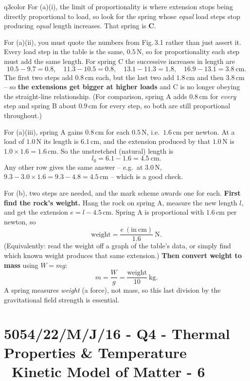 \documentclass[11pt,a4paper]{article}
\newcommand{\examq}[4]{\section[#1 - Q#2]{#1 - Q#2 - #3 - #4}}
\begin{document}
\begin{ansbox}{q3color}
For (a)(i), the limit of proportionality is where extension stops being directly proportional to load, so look for the spring whose \emph{equal} load steps stop producing \emph{equal} length increases. That spring is \textbf{C}.

For (a)(ii), you must quote the numbers from Fig.\,3.1 rather than just assert it. Every load step in the table is the same, $0.5$\,N, so for proportionality each step must add the same length. For spring C the successive increases in length are
\[ 10.5 - 9.7 = 0.8, \quad 11.3 - 10.5 = 0.8, \quad 13.1 - 11.3 = 1.8, \quad 16.9 - 13.1 = 3.8\ \mathrm{cm}. \]
The first two steps add $0.8$\,cm each, but the last two add $1.8$\,cm and then $3.8$\,cm -- so \textbf{the extensions get bigger at higher loads} and C is no longer obeying the straight-line relationship. (For comparison, spring A adds $0.8$\,cm for \emph{every} step and spring B about $0.9$\,cm for every step, so both are still proportional throughout.)

For (a)(iii), spring A gains $0.8$\,cm for each $0.5$\,N, i.e.\ $1.6$\,cm per newton. At a load of $1.0$\,N its length is $6.1$\,cm, and the extension produced by that $1.0$\,N is $1.0 \times 1.6 = 1.6$\,cm. So the unstretched (natural) length is
\[ l_0 = 6.1 - 1.6 = 4.5\ \mathrm{cm}. \]
Any other row gives the same answer -- e.g.\ at $3.0$\,N, $9.3 - 3.0 \times 1.6 = 9.3 - 4.8 = 4.5$\,cm -- which is a good check.

For (b), two steps are needed, and the mark scheme awards one for each. \textbf{First find the rock's weight.} Hang the rock on spring A, measure the new length $l$, and get the extension $e = l - 4.5$\,cm. Spring A is proportional with $1.6$\,cm per newton, so
\[ \text{weight} = \frac{e\ (\mathrm{in\ cm})}{1.6}\ \mathrm{N}. \]
(Equivalently: read the weight off a graph of the table's data, or simply find which known weight produces that same extension.) \textbf{Then convert weight to mass} using $W = mg$:
\[ m = \frac{W}{g} = \frac{\text{weight}}{10}\ \mathrm{kg}. \]
A spring measures \emph{weight} (a force), not mass, so this last division by the gravitational field strength is essential.
\end{ansbox}

\examq{5054/22/M/J/16}{4}{Thermal Properties \& Temperature \textperiodcentered\ Kinetic Model of Matter}{6}
\end{document}
